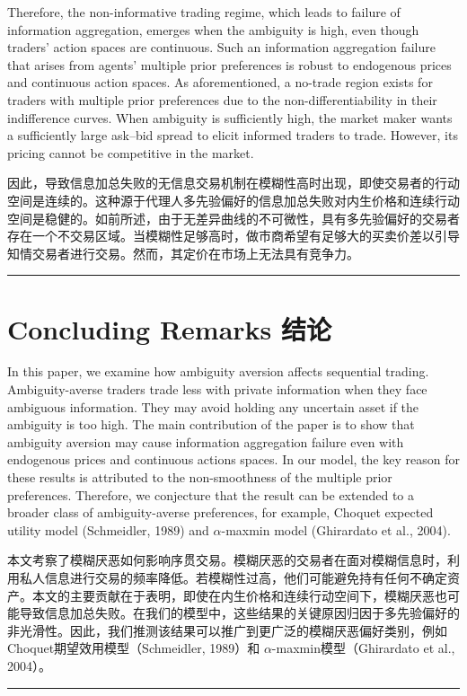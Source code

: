 \documentclass[12pt,a4paper]{article}
\newenvironment{original}{%
  \par\vspace{4pt}\noindent%
  \color{black}%
  \ignorespaces
}{%
  \par\vspace{2pt}%
}
\newenvironment{translation}{%
  \par\vspace{2pt}\noindent%
  \color{transblue}%
  \ignorespaces
}{%
  \par\vspace{4pt}\hrule\vspace{6pt}%
}
\begin{document}
\begin{original}
Therefore, the non-informative trading regime, which leads to failure of information aggregation, emerges when the ambiguity is high, even though traders' action spaces are continuous. Such an information aggregation failure that arises from agents' multiple prior preferences is robust to endogenous prices and continuous action spaces. As aforementioned, a no-trade region exists for traders with multiple prior preferences due to the non-differentiability in their indifference curves. When ambiguity is sufficiently high, the market maker wants a sufficiently large ask--bid spread to elicit informed traders to trade. However, its pricing cannot be competitive in the market.
\end{original}
\begin{translation}
因此，导致信息加总失败的无信息交易机制在模糊性高时出现，即使交易者的行动空间是连续的。这种源于代理人多先验偏好的信息加总失败对内生价格和连续行动空间是稳健的。如前所述，由于无差异曲线的不可微性，具有多先验偏好的交易者存在一个不交易区域。当模糊性足够高时，做市商希望有足够大的买卖价差以引导知情交易者进行交易。然而，其定价在市场上无法具有竞争力。
\end{translation}

\newpage

\section{Concluding Remarks \hfill 结论}

\begin{original}
In this paper, we examine how ambiguity aversion affects sequential trading. Ambiguity-averse traders trade less with private information when they face ambiguous information. They may avoid holding any uncertain asset if the ambiguity is too high. The main contribution of the paper is to show that ambiguity aversion may cause information aggregation failure even with endogenous prices and continuous actions spaces. In our model, the key reason for these results is attributed to the non-smoothness of the multiple prior preferences. Therefore, we conjecture that the result can be extended to a broader class of ambiguity-averse preferences, for example, Choquet expected utility model (Schmeidler, 1989) and $\alpha$-maxmin model (Ghirardato et al., 2004).
\end{original}
\begin{translation}
本文考察了模糊厌恶如何影响序贯交易。模糊厌恶的交易者在面对模糊信息时，利用私人信息进行交易的频率降低。若模糊性过高，他们可能避免持有任何不确定资产。本文的主要贡献在于表明，即使在内生价格和连续行动空间下，模糊厌恶也可能导致信息加总失败。在我们的模型中，这些结果的关键原因归因于多先验偏好的非光滑性。因此，我们推测该结果可以推广到更广泛的模糊厌恶偏好类别，例如Choquet期望效用模型（Schmeidler, 1989）和 $\alpha$-maxmin模型（Ghirardato et al., 2004）。
\end{translation}
\end{document}
